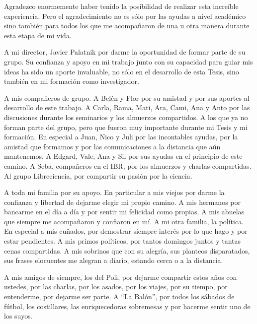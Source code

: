
\begin{acknowledgements}      

Agradezco enormemente haber tenido la posibilidad de realizar esta increíble experiencia.
Pero el agradecimiento no es sólo por las ayudas a nivel académico sino también para todos los que me acompañaron de una u otra manera durante esta etapa de mi vida.

A mi director, Javier Palatnik por darme la oportunidad de formar parte de su grupo.
Su confianza y apoyo en mi trabajo junto con su capacidad para guiar mis ideas ha sido un aporte invaluable, no sólo en el desarrollo de esta Tesis, sino también en mi formación como investigador.

A mis compañeros de grupo. 
A Belén y Flor por su amistad y por sus aportes al desarrollo de este trabajo.
A Carla, Rama, Mati, Ara, Cami, Ana y Anto por las discusiones durante los seminarios y los almuerzos compartidos.
A los que ya no forman parte del grupo, pero que fueron muy importante durante mi Tesis y mi formación.
En especial a  Juan, Nico y Juli por las incontables ayudas, por la amistad que formamos y por las comunicaciones a la distancia que aún mantenemos.
A Edgard, Vale, Ana y Sil por sus ayudas en el principio de este camino.
A Seba, compañeros en el IBR, por los almuerzos y charlas compartidas.
Al grupo Libreciencia, por compartir su pasión por la ciencia.

A toda mi familia por su apoyo.
En particular a mis viejos por darme la confianza y libertad de dejarme elegir mi propio camino. 
A mis hermanos por bancarme en el día a día y por sentir mi felicidad como propias.
A mis abuelas que siempre me acompañaron y confiaron en mí.
A mi otra familia, la política. 
En especial a mis cuñados, por demostrar siempre interés por lo que hago y por estar pendientes.
A mis primos políticos, por tantos domingos juntos y tantas cenas compartidas.
A mis sobrinos que con su alegría, sus planteos disparatados, sus frases elocuentes me alegran a diario, estando cerca o a la distancia.

A mis amigos de siempre, los del Poli, por dejarme compartir estos años con ustedes, por las charlas, por los asados, por los viajes, por su tiempo, por entenderme, por dejarme ser parte.
A ``La Balón'', por todos los sábados de fútbol, los costillares, las enriquecedoras sobremesas y por hacerme sentir uno de los suyos.


\end{acknowledgements}

